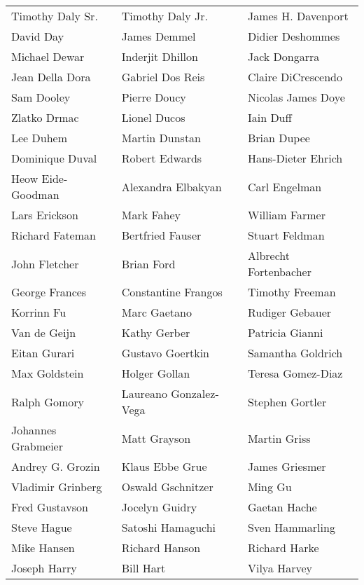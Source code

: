 \begin{tabular}{lll}
Timothy Daly Sr.       & Timothy Daly Jr.       & James H. Davenport\\
David Day              & James Demmel           & Didier Deshommes\\
Michael Dewar          & Inderjit Dhillon       & Jack Dongarra\\
Jean Della Dora        & Gabriel Dos Reis       & Claire DiCrescendo\\
Sam Dooley             & Pierre Doucy           & Nicolas James Doye\\
Zlatko Drmac           & Lionel Ducos           & Iain Duff\\
Lee Duhem              & Martin Dunstan         & Brian Dupee\\
Dominique Duval        & Robert Edwards         & Hans-Dieter Ehrich\\
Heow Eide-Goodman      & Alexandra Elbakyan     & Carl Engelman\\
Lars Erickson          & Mark Fahey             & William Farmer\\
Richard Fateman        & Bertfried Fauser       & Stuart Feldman\\
John Fletcher          & Brian Ford             & Albrecht Fortenbacher\\
George Frances         & Constantine Frangos    & Timothy Freeman\\
Korrinn Fu             & Marc Gaetano           & Rudiger Gebauer\\
Van de Geijn           & Kathy Gerber           & Patricia Gianni\\
Eitan Gurari           & Gustavo Goertkin       & Samantha Goldrich\\
Max Goldstein          & Holger Gollan          & Teresa Gomez-Diaz\\
Ralph Gomory           & Laureano Gonzalez-Vega & Stephen Gortler\\
Johannes Grabmeier     & Matt Grayson           & Martin Griss\\
Andrey G. Grozin       & Klaus Ebbe Grue        & James Griesmer\\
Vladimir Grinberg      & Oswald Gschnitzer      & Ming Gu\\
Fred Gustavson         & Jocelyn Guidry         & Gaetan Hache\\
Steve Hague            & Satoshi Hamaguchi      & Sven Hammarling\\
Mike Hansen            & Richard Hanson         & Richard Harke\\
Joseph Harry           & Bill Hart              & Vilya Harvey\\

\end{tabular}
